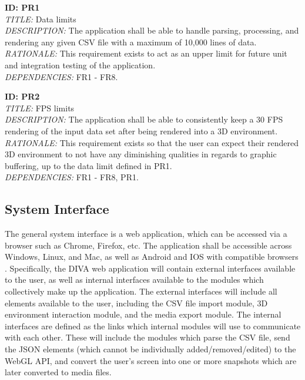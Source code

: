 \documentclass[journal,10pt,onecolumn,compsoc]{IEEEtran} \usepackage[margin=1.0in]{geometry} \usepackage{pdfpages}
\begin{document}
    \noindent \textbf{ID: PR1}\\
    \textit{TITLE:} Data limits\\
    \textit{DESCRIPTION:} The application shall be able to handle parsing, processing, and rendering any given CSV file with a maximum of 10,000 lines of data. \\
    \textit{RATIONALE:} This requirement exists to act as an upper limit for future unit and integration testing of the application. \\
    \textit{DEPENDENCIES:} FR1 - FR8.
    \newline
    
    \noindent \textbf{ID: PR2}\\
    \textit{TITLE:} FPS limits\\
    \textit{DESCRIPTION:} The application shall be able to consistently keep a 30 FPS rendering of the input data set after being rendered into a 3D environment.\\
    \textit{RATIONALE:} This requirement exists so that the user can expect their rendered 3D environment to not have any diminishing qualities in regards to graphic buffering, up to the data limit defined in PR1.\\
    \textit{DEPENDENCIES:} FR1 - FR8, PR1.

    \subsection{System Interface}
    \noindent The general system interface is a web application, which can be accessed via a browser such as Chrome, Firefox, etc. The application shall be accessible across Windows, Linux, and Mac, as well as Android and IOS with compatible browsers \cite{WebGL}. \newline
    \noindent Specifically, the DIVA web application will contain external interfaces available to the user, as well as internal interfaces available to the modules which collectively make up the application. The external interfaces will include all elements available to the user, including the CSV file import module, 3D environment interaction module, and the media export module. The internal interfaces are defined as the links which internal modules will use to communicate with each other. These will include the modules which parse the CSV file, send the JSON elements (which  cannot  be individually added/removed/edited) to the WebGL API, and convert the user's screen into one or more snapshots which are later converted to media files.
 
\end{document}
